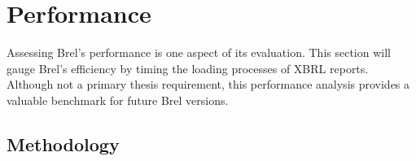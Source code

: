 \section{Performance}
\label{sec:performance}

Assessing Brel's performance is one aspect of its evaluation.
This section will gauge Brel's efficiency by timing the loading processes of XBRL reports.
Although not a primary thesis requirement, this performance analysis
provides a valuable benchmark for future Brel versions.

\subsection{Methodology}


